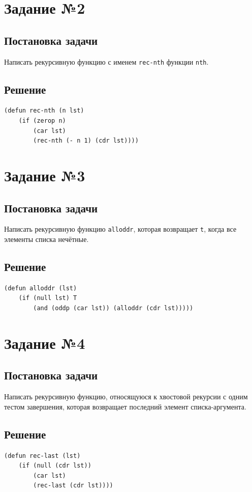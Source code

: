 \documentclass[12pt]{report}
\begin{document}
\section*{Задание №2}
\subsection*{Постановка задачи}
Написать рекурсивную функцию с именем \texttt{rec-nth} функции \texttt{nth}.

\subsection*{Решение}
\begin{lstlisting}
(defun rec-nth (n lst)
	(if (zerop n)
		(car lst)
		(rec-nth (- n 1) (cdr lst))))
\end{lstlisting}

\section*{Задание №3}
\subsection*{Постановка задачи}
Написать рекурсивную функцию \texttt{alloddr}, которая возвращает \texttt{t}, когда все элементы списка нечётные.

\subsection*{Решение}
\begin{lstlisting}
(defun alloddr (lst)
	(if (null lst) T
		(and (oddp (car lst)) (alloddr (cdr lst)))))
\end{lstlisting}

\section*{Задание №4}
\subsection*{Постановка задачи}
Написать рекурсивную функцию, относящуюся к хвостовой рекурсии с одним тестом завершения, которая возвращает последний элемент списка-аргумента.

\subsection*{Решение}
\begin{lstlisting}
(defun rec-last (lst)
	(if (null (cdr lst))
		(car lst)
		(rec-last (cdr lst))))
\end{lstlisting}
\end{document}
